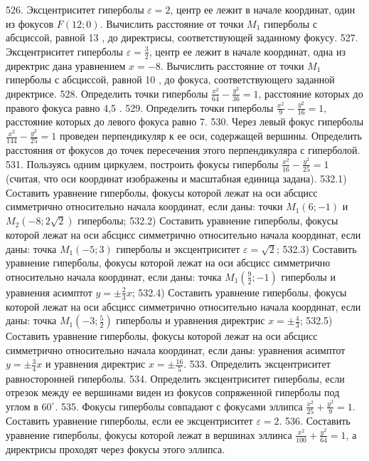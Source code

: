 526. Эксцентриситет гиперболы $\varepsilon=2$, центр ее лежит в начале координат, один из фокусов $F(12 ; 0)$. Вычислить расстояние от точки $M_1$ гиперболы с абсциссой, равной 13 , до директрисы, соответствующей заданному фокусу.
527. Эксцентриситет гиперболы $\varepsilon=\frac{3}{2}$, центр ее лежит в начале координат, одна из директрис дана уравнением $x=-8$. Вычислить расстояние от точки $M_1$ гиперболы с абсциссой, равной 10 , до фокуса, соответствующего заданной директрисе.
528. Определить точки гиперболы $\frac{x^2}{64}-\frac{y^2}{36}=1$, расстояние которых до правого фокуса равно 4,5 .
529. Определить точки гиперболы $\frac{x^2}{9}-\frac{y^2}{16}=1$, расстояние которых до левого фокуса равно 7.
530. Через левый фокус гиперболы $\frac{x^2}{144}-\frac{y^2}{25}=1$ проведен перпендикуляр к ее оси, содержащей вершины. Определить расстояния от фокусов до точек пересечения этого перпендикуляра с гиперболой.
531. Пользуясь одним циркулем, построить фокусы гиперболы $\frac{x^2}{16}-\frac{y^2}{25}=1$ (считая, что оси координат изображены и масштабная единица задана).
532.1) Составить уравнение гиперболы, фокусы которой лежат на оси абсцисс симметрично относительно начала координат, если даны: точки $M_1(6 ;-1)$ и $M_2(-8 ; 2 \sqrt{2})$ гиперболы;
532.2) Составить уравнение гиперболы, фокусы которой лежат на оси абсцисс симметрично относительно начала координат, если даны: точка $M_1(-5 ; 3)$ гиперболы и эксцентриситет $\varepsilon=\sqrt{2}$;
532.3) Составить уравнение гиперболы, фокусы которой лежат на оси абсцисс симметрично относительно начала координат, если даны: точка $M_1\left(\frac{9}{2} ;-1\right)$ гиперболы и уравнения асимптот $y= \pm \frac{2}{3} x$;
532.4) Составить уравнение гиперболы, фокусы которой лежат на оси абсцисс симметрично относительно начала координат, если даны: точка $M_1\left(-3 ; \frac{5}{2}\right)$ гиперболы и уравнения директрис $x= \pm \frac{4}{3}$;
532.5) Составить уравнение гиперболы, фокусы которой лежат на оси абсцисс симметрично относительно начала координат, если даны: уравнения асимптот $y= \pm \frac{3}{4} x$ и уравнения директрис $x= \pm \frac{16}{5}$.
533. Определить эксцентриситет равносторонней гиперболы.
534. Определить эксцентриситет гиперболы, если отрезок между ее вершинами виден из фокусов сопряженной гиперболы под углом в $60^{\circ}$.
535. Фокусы гиперболы совпадают с фокусами эллипса $\frac{x^2}{25}+\frac{y^2}{9}=1$. Составить уравнение гиперболы, если ее эксцентриситет $\varepsilon=2$.
536. Составить уравнение гиперболы, фокусы которой лежат в вершинах эллинса $\frac{x^2}{100}+\frac{y^2}{64}=1$, а директрисы проходят через фокусы этого эллипса.
